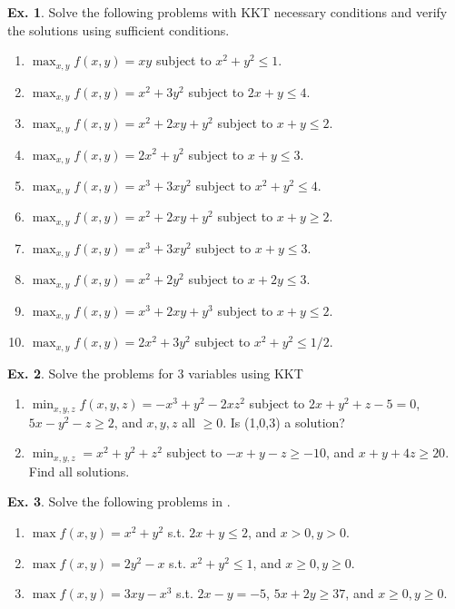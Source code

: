 \documentclass[10pt,a4paper]{book}
\theoremstyle{definition}\newtheorem{definition}{Definition}
\theoremstyle{definition}\newtheorem{fact}{Fact}
\theoremstyle{definition}\newtheorem{ex}{Ex.}
\theoremstyle{definition}\newtheorem{project}{Project}
\theoremstyle{definition}\newtheorem{problem}{Problem}
\theoremstyle{definition}\newtheorem{example}{Example}
\numberwithin{theorem}{chapter}
\numberwithin{corollary}{chapter}
\numberwithin{assumption}{chapter}
\numberwithin{definition}{chapter}
\numberwithin{prop}{chapter}
\numberwithin{notation}{chapter}
\numberwithin{problem}{chapter}
\numberwithin{example}{chapter}
\numberwithin{fact}{chapter}
\numberwithin{ex}{chapter}
\begin{document}
	\begin{ex}
		Solve the following problems with KKT necessary conditions and verify the solutions using sufficient conditions.
		\begin{enumerate}
			\item $\max_{x,y}  f(x,y) = xy$ subject to  $x^2 + y^2 \leq 1$.
			
			\item $\max_{x,y}  f(x,y) = x^2 + 3y^2$ subject to  $2x + y \leq 4$.
			
			\item $\max_{x,y}  f(x,y) = x^2 + 2xy + y^2$ subject to  $x + y \leq 2$.
			
			\item $\max_{x,y}  f(x,y) = 2x^2 + y^2$ subject to $x + y \leq 3$.
			
			\item $\max_{x,y}  f(x,y) = x^3 + 3xy^2$ subject to $x^2 + y^2 \leq 4$.
			
			\item $\max_{x,y}  f(x,y) = x^2 + 2xy + y^2$ subject to  $x + y \geq 2$.
			
			\item $\max_{x,y}  f(x,y) = x^3 + 3xy^2$ subject to $x + y \leq 3$.
			
			\item $\max_{x,y}  f(x,y) = x^2 + 2y^2$ subject to $x + 2y \leq 3$.
			
			\item $\max_{x,y}  f(x,y) = x^3 + 2xy + y^3$ subject to $x + y \leq 2$.
			
			\item $\max_{x,y}  f(x,y) = 2x^2 + 3y^2$ subject to $x^2 + y^2 \leq 1/2$.
		\end{enumerate}
	\end{ex}
	
	\begin{ex}
		Solve the problems for 3 variables using KKT
		\begin{enumerate}
			\item $\min_{x,y,z} f(x,y,z) = -x^3 + y^2 - 2xz^2$ subject to $2x+y^2+z-5=0$, $5x - y^2 - z \geq 2$, and $x,y,z$ all $\geq 0$.  Is (1,0,3) a solution?
			\item $\min_{x,y,z} = x^2 + y^2 + z^2$ subject to $-x + y - z \geq -10$, and $x+y+4z \geq 20$. Find all solutions.
		\end{enumerate}
	\end{ex}

	\begin{ex}
		Solve the following problems in \citet{simon1994mathematics}.
		\begin{enumerate}
			\item $\max f(x,y) = x^2 + y^2$ s.t. $2x + y \leq 2$, and $x > 0, y> 0$. 
			\item $\max f(x,y) = 2 y^2 - x$ s.t. $x^2 + y^2 \leq 1$, and $x \geq 0, y \geq 0$. 
			\item $\max f(x,y) = 3 xy - x^3$ s.t. $2x - y = -5$, $5x + 2y \geq 37$, and $x\geq 0, y \geq 0$.
		\end{enumerate}
	\end{ex}
	
\end{document}
